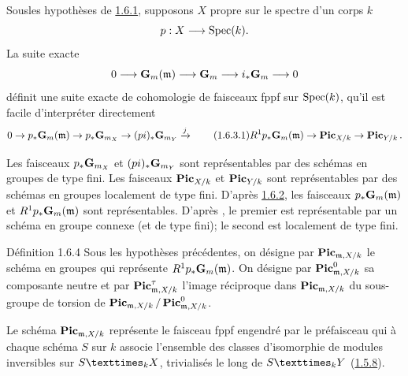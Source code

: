 \documentclass[10pt]{../fichiers-configuration-latex/smfart}
\begin{document}
\subsubsection{}
Sous\pageoriginale les hypothèses de \hyperref[XVIII.lem1.6.1]{1.6.1}, supposons
$X$ propre sur le spectre d'un corps $k$
$$
p:X\longrightarrow \operatorname{Spec}(k){}.
$$
La suite exacte
$$
0\longrightarrow \mathbf{G}_{m}(\mathfrak{m})\longrightarrow
\mathbf{G}_{m}\longrightarrow i_{\ast}\mathbf{G}_{m}\longrightarrow 0
$$
définit une suite exacte de cohomologie de faisceaux fppf sur $\operatorname{Spec}
(k)$, qu'il est facile d'interpréter directement
\begin{equation*}
 0\rightarrow p_{\ast}\mathbf{G}_{m}(\mathfrak{m})\rightarrow
p_{\ast}\mathbf{G}_{m_{X}}\rightarrow
(pi)_{\ast}\mathbf{G}_{m_{Y}}\xrightarrow{j}\tag{1.6.3.1}
 R^{1}p_{\ast}\mathbf{G}_{m}(\mathfrak{m})\rightarrow
\operatorname{\mathbf{Pic}}_{X/k}\rightarrow \operatorname{\mathbf{Pic}}_{Y/k}{}.
\end{equation*}

Les faisceaux $p_{\ast}\mathbf{G}_{m_{X}}$ et
$(pi)_{\ast}\mathbf{G}_{m_{Y}}$ sont représentables par des schémas en
groupes de type fini. Les faisceaux $\operatorname{\mathbf{Pic}}_{X/k}$ et
$\operatorname{\mathbf{Pic}}_{Y/k}$ sont représentables par des schémas en groupes
localement de type fini. D'après \hyperref[XVIII.subsubsec1.6.2]{1.6.2}, les faisceaux
$p_{\ast}\mathbf{G}_{m}(\mathfrak{m})$ et
$R^{1}p_{\ast}\mathbf{G}_{m}(\mathfrak{m})$ sont représentables. D'après
, le premier est représentable par un schéma en groupe
connexe (et de type fini); le second est localement de type fini.

\begin{enonce*}{Définition 1.6.4}
Sous les hypothèses précédentes, on désigne par
$\operatorname{\mathbf{Pic}}_{\mathfrak{m},X/k}$ le schéma en groupes qui représente
$R^{1}p_{\ast}\mathbf{G}_{m}(\mathfrak{m})$. On désigne par
$\operatorname{\mathbf{Pic}}^{0}_{\mathfrak{m},X/k}$ sa composante neutre et par
$\operatorname{\mathbf{Pic}}^{\tau}_{\mathfrak{m},X/k}$ l'image réciproque dans
$\operatorname{\mathbf{Pic}}_{\mathfrak{m},X/k}$ du sous-groupe de torsion de
$\operatorname{\mathbf{Pic}}_{\mathfrak{m},X/k}/\operatorname{\mathbf{Pic}}^{0}_{\mathfrak{m},X/k}$.
\end{enonce*}

Le schéma $\operatorname{\mathbf{Pic}}_{\mathfrak{m},X/k}$ représente le faisceau fppf engendré par
le préfaisceau qui à chaque schéma $S$ sur $k$ associe l'ensemble
des classes d'isomorphie de modules inversibles sur $\fprod{S}{X}{k}$,
trivialisés le long de $\fprod{S}{Y}{k}$ (\hyperref[XVIII.subsubsec1.5.8]{1.5.8}).
\end{document}
